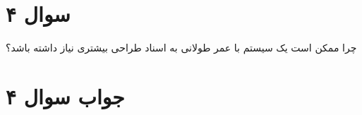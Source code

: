 \section*{سوال ۴}

چرا ممکن است یک سیستم با عمر طولانی به اسناد طراحی بیشتری نیاز داشته باشد؟

\section*{جواب سوال ۴}


